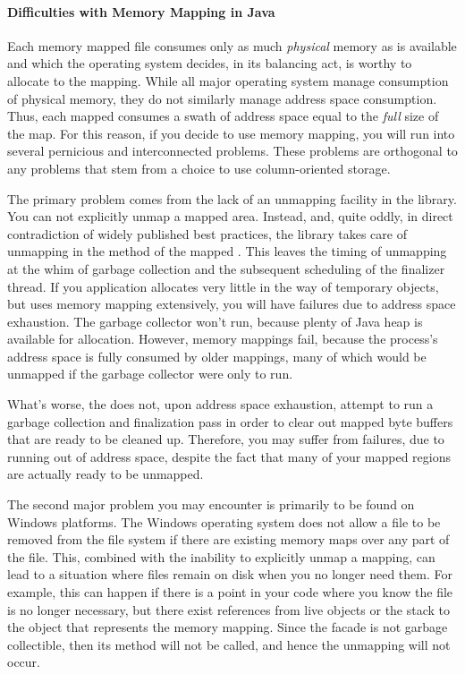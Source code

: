 
\paragraph{Difficulties with Memory Mapping in Java}

Each memory mapped file consumes only as much \emph{physical} memory as is
available and which the operating system decides, in its balancing act, is worthy
to allocate to the mapping. While all major operating system manage consumption
of physical memory, they do not similarly manage address space consumption. Thus,
each mapped  consumes a swath of address space equal to the
\emph{full} size of the map. For this reason, if you decide to use memory
mapping, you will run into several pernicious and interconnected problems. These
problems are orthogonal to any problems that stem from a choice to use
column-oriented storage.

The primary problem comes from the lack of an unmapping facility in the
 library. You can not explicitly unmap a mapped area. Instead,
and, quite oddly, in direct contradiction of widely published best practices, the
library takes care of unmapping in the  method of the mapped
. This leaves the timing of unmapping at the whim of garbage
collection and the subsequent scheduling of the finalizer thread. If you
application allocates very little in the way of temporary objects, but uses
memory mapping extensively, you will have failures due to address space
exhaustion. The garbage collector won't run, because plenty of Java heap is
available for allocation. However, memory mappings fail, because the process's
address space is fully consumed by older mappings, many of which would be
unmapped if the garbage collector were only to run.

What's worse, the \jre does not, upon address space exhaustion, attempt to run a
garbage collection and finalization pass in order to clear out mapped byte
buffers that are ready to be cleaned up. Therefore, you may suffer from
 failures,
due to running out of address space, despite the fact that many of your mapped
regions are actually ready to be unmapped.

The second major problem you may encounter is primarily to be found on Windows
platforms. The Windows operating system does not allow a file to be removed from
the file system if there are existing memory maps over any part of the file.
This, combined with the inability to explicitly unmap a mapping, can lead to a
situation where files remain on disk when you no longer need them. For example,
this can happen if there is a point in your code where you know the file is no
longer necessary, but there exist references from live objects or the stack to
the  object that represents the memory mapping. Since the
 facade is not garbage collectible, then its 
method will not be called, and hence the unmapping will not occur.

